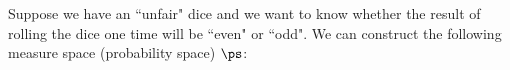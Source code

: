 \begin{example}
\label{ex:prob_even_odd_dice}
Suppose we have an ``unfair" dice and we want to know whether
the result of rolling the dice one time will be ``even" or ``odd".
We can construct the following measure space (probability space) $\ps$:

\end{example}

